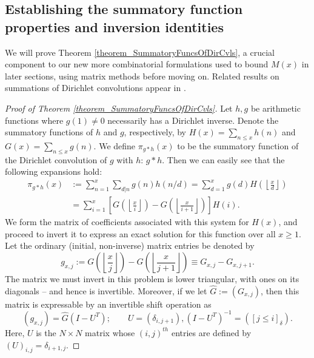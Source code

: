 \documentclass[11pt,reqno,a4letter]{article}
\numberwithin{figure}{section}
\numberwithin{table}{section}
\newcommand{\cf}{\textit{cf.\ }}
\newcommand{\Iverson}[1]{\ensuremath{\left[#1\right]_{\delta}}}
\newcommand{\floor}[1]{\left\lfloor #1 \right\rfloor}
\theoremstyle{plain}
\numberwithin{theorem}{section}
\theoremstyle{definition}
\begin{document}
\subsection{Establishing the summatory function properties and inversion identities} 

We will prove Theorem \ref{theorem_SummatoryFuncsOfDirCvls}, a crucial component to our new more combinatorial 
formulations used to bound $M(x)$ in later sections, using matrix methods before moving on. 
Related results on summations of Dirichlet convolutions appear in 
\cite[\S 2.14; \S 3.10; \S 3.12; \cf \S 4.9, p.\ 95]{APOSTOLANUMT}. 

\begin{proof}[Proof of Theorem \ref{theorem_SummatoryFuncsOfDirCvls}] 
\label{proofOf_theorem_SummatoryFuncsOfDirCvls} 
Let $h,g$ be arithmetic functions where $g(1) \neq 0$ 
necessarily has a Dirichlet inverse. Denote the summatory functions of $h$ and $g$, 
respectively, by $H(x) = \sum_{n \leq x} h(n)$ and $G(x) = \sum_{n \leq x} g(n)$. 
We define $\pi_{g \ast h}(x)$ to be the summatory function of the 
Dirichlet convolution of $g$ with $h$: $g \ast h$. 
Then we can easily see that the following expansions hold: 
\begin{align*} 
\pi_{g \ast h}(x) & := \sum_{n=1}^{x} \sum_{d|n} g(n) h(n/d) = \sum_{d=1}^x g(d) H\left(\floor{\frac{x}{d}}\right) \\ 
     & = \sum_{i=1}^x \left[G\left(\floor{\frac{x}{i}}\right) - G\left(\floor{\frac{x}{i+1}}\right)\right] H(i). 
\end{align*} 
We form the matrix of coefficients associated with this system for $H(x)$, and proceed to invert it to express an 
exact solution for this function over all $x \geq 1$. Let the ordinary (initial, non-inverse) matrix entries be denoted by 
\[
g_{x,j} := G\left(\floor{\frac{x}{j}}\right) - G\left(\floor{\frac{x}{j+1}}\right) \equiv G_{x,j} - G_{x,j+1}. 
\]
The matrix we must invert in this problem is lower triangular, with ones on its diagonals -- and hence is invertible. 
Moreover, if we let $\hat{G} := (G_{x,j})$, then this matrix is 
expressable by an invertible shift operation as 
\[
(g_{x,j}) = \hat{G} (I - U^{T}); \qquad U = (\delta_{i,j+1}), (I - U^T)^{-1} = (\Iverson{j \leq i}). 
\]
Here, $U$ is the $N \times N$ matrix whose $(i,j)^{th}$ entries are defined by 
$(U)_{i,j} = \delta_{i+1,j}$. 


\end{proof}
\end{document}
